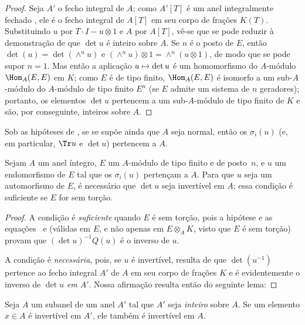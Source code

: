 \documentclass[oneside,10pt]{amsart}
\makeatletter
\newcommand{\ega@arrow}[2]{\mathchoice{#1}{#2}{#2}{#2}}
\let\ega@shortmapsto\mapsto
\renewcommand{\mapsto}{\ega@arrow{\longmapsto}{\ega@shortmapsto}}
\newcommand{\oldpage}[2][]{\marginnote{\normalfont\footnotesize\textbf{#1}~|~#2}\ignorespaces}
\let\EGAOriginalLabel\label
\renewcommand{\label}[1]{\phantomsection\EGAOriginalLabel{#1}}
\makeatother
\begin{document}
\begin{proof}
Seja $A'$ o fecho integral de $A$;
como $A'[T]$ é um anel integralmente fechado \cite[p.~99]{II-24}, ele é o fecho integral de $A[T]$ em seu corpo de frações $K(T)$.
Substituindo $u$ por $T\cdot I-u\otimes1$ e $A$ por $A[T]$, vê-se que se pode reduzir à demonstração de que $\det u$ é inteiro sobre $A$.
Se $n$ é o posto de $E$, então $\det(u)=\det(\wedge^n u)$ e $(\wedge^n u)\otimes1=\wedge^n(u\otimes1)$, de modo que se pode supor $n=1$.
Mas então a aplicação $u\mapsto\det u$ é um homomorfismo do $A$-módulo $\Hom_A(E,E)$ em $K$;
como $E$ é de tipo finito, $\Hom_A(E,E)$ é isomorfo a um sub-$A$-módulo do $A$-módulo de tipo finito $E^n$ (se $E$ admite um sistema de $n$ geradores); portanto, os elementos $\det u$ pertencem a um sub-$A$-módulo de tipo finito de $K$ e são, por conseguinte, inteiros sobre $A$.
\end{proof}
\oldpage[II]{122}
\begin{corollary}[6.4.4]
\label{II.6.4.4}
Sob as hipóteses de , se se supõe ainda que $A$ seja normal, então os $\sigma_i(u)$ (e, em particular, $\Tr u$ e $\det u$) pertencem a $A$.
\end{corollary}

\begin{proposition}[6.4.5]
\label{II.6.4.5}
Sejam $A$ um anel íntegro, $E$ um $A$-módulo de tipo finito e de posto~$n$, e $u$ um endomorfismo de $E$ tal que os $\sigma_i(u)$ pertençam a $A$.
Para que $u$ seja um automorfismo de $E$, é necessário que $\det u$ seja invertível em $A$;
essa condição é suficiente se $E$ for sem torção.
\end{proposition}

\begin{proof}
A condição é \emph{suficiente} quando $E$ é sem torção, pois a hipótese e as equações~ e  (válidas em $E$, e não apenas em $E\otimes_A K$, visto que $E$ é sem torção) provam que $(\det u)^{-1}Q(u)$ é o inverso de $u$.

A condição é \emph{necessária}, pois, se $u$ é invertível, resulta de  que $\det(u^{-1})$ pertence ao fecho integral $A'$ de $A$ em seu corpo de frações $K$ e é evidentemente o inverso de $\det u$ \emph{em $A'$}.
Nossa afirmação resulta então do seguinte lema:
\end{proof}

\begin{lemma}[6.4.5.1]
\label{II.6.4.5.1}
Seja $A$ um subanel de um anel $A'$ tal que $A'$ seja \emph{inteiro} sobre $A$.
Se um elemento $x\in A$ é invertível em $A'$, ele também é invertível em $A$.
\end{lemma}
\end{document}
